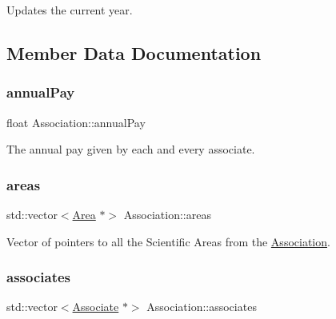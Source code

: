 Updates the current year. 



\subsection{Member Data Documentation}
\mbox{\label{classAssociation_a19f8a7aad1491bc14f558b0b852da0a4}} 
\subsubsection{\texorpdfstring{annual\+Pay}{annualPay}}
{\footnotesize\ttfamily float Association\+::annual\+Pay\hspace{0.3cm}{\ttfamily [private]}}



The annual pay given by each and every associate. 

\mbox{\label{classAssociation_a6e0125297a1927aae76d14710fc02862}} 
\subsubsection{\texorpdfstring{areas}{areas}}
{\footnotesize\ttfamily std\+::vector$<$\hyperlink{classArea}{Area} $\ast$$>$ Association\+::areas\hspace{0.3cm}{\ttfamily [private]}}



Vector of pointers to all the Scientific Areas from the \hyperlink{classAssociation}{Association}. 

\mbox{\label{classAssociation_a9b350d7abc7358f9bd8476438df89792}} 
\subsubsection{\texorpdfstring{associates}{associates}}
{\footnotesize\ttfamily std\+::vector$<$\hyperlink{classAssociate}{Associate} $\ast$$>$ Association\+::associates\hspace{0.3cm}{\ttfamily [private]}}




